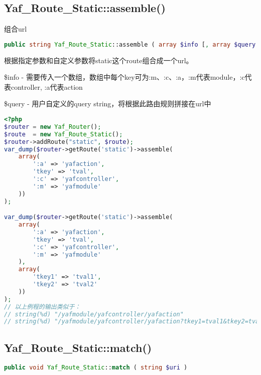 \subsection{Yaf\_Route\_Static::assemble()}

组合url





\begin{lstlisting}[language=PHP]
public string Yaf_Route_Static::assemble ( array $info [, array $query ] )
\end{lstlisting}

根据指定参数和自定义参数将static这个route组合成一个url。

\begin{compactitem}
\item \$info - 需要传入一个数组，数组中每个key可为:m、:c、:a，:m代表module，:c代表controller, :a代表action

\item \$query - 用户自定义的query string，将根据此路由规则拼接在url中

\end{compactitem}



\begin{lstlisting}[language=PHP]
<?php
$router = new Yaf_Router();
$route  = new Yaf_Route_Static();
$router->addRoute("static", $route);
var_dump($router->getRoute('static')->assemble(
    array(
        ':a' => 'yafaction',
        'tkey' => 'tval',
        ':c' => 'yafcontroller',
        ':m' => 'yafmodule'
    ))
);

var_dump($router->getRoute('static')->assemble(
    array(
        ':a' => 'yafaction',
        'tkey' => 'tval',
        ':c' => 'yafcontroller',
        ':m' => 'yafmodule'
    ),
    array(
        'tkey1' => 'tval1',
        'tkey2' => 'tval2'
    ))
);
// 以上例程的输出类似于：
// string(%d) "/yafmodule/yafcontroller/yafaction"
// string(%d) "/yafmodule/yafcontroller/yafaction?tkey1=tval1&tkey2=tval2"
\end{lstlisting}

\subsection{Yaf\_Route\_Static::match()}


\begin{lstlisting}[language=PHP]
public void Yaf_Route_Static::match ( string $uri )
\end{lstlisting}

